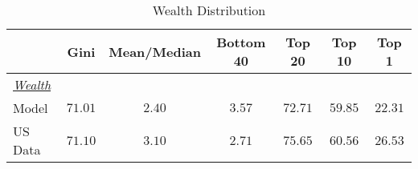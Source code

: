 \documentclass[12pt]{article}
\begin{document}
 \begin{table}[h]
 \caption{Wealth Distribution}
 \label{tab:wealth_inc_all}
 \begin{center}
 \begin{tabular}{lcccccc}
 \hline 

 & Gini & Mean/Median & Bottom 40 & Top 20 & Top 10 & Top 1  \\
 \hline 

 \hline 

 \textit{\underline{Wealth}}  &  &  &  &  & &  \\ 
  Model &  $71.01$ & $ 2.40$ & $ 3.57$ & $72.71$ & $59.85$ & $22.31$ \\ 
  US Data &  $71.10$ & $ 3.10$ & $ 2.71$ & $75.65$ & $60.56$ & $26.53$ \\ 
 \hline
 \end{tabular}
 \end{center}
 \end{table}
\end{document}
